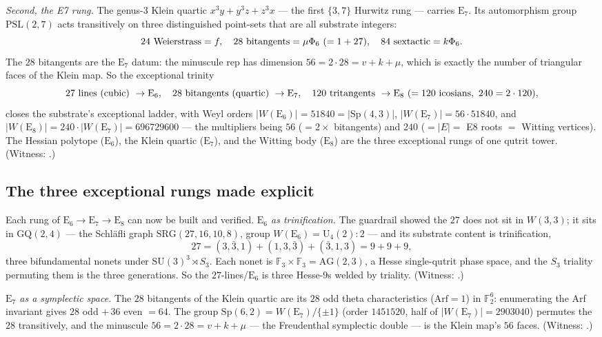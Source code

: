 \documentclass[11pt]{article}
\begin{document}
\emph{Second, the E7 rung.} The genus-$3$ Klein quartic
$x^3y+y^3z+z^3x$ --- the first $\{3,7\}$ Hurwitz rung --- carries $\mathrm E_7$.
Its automorphism group $\mathrm{PSL}(2,7)$ acts transitively on three
distinguished point-sets that are all substrate integers:
\[
  24\ \hbox{Weierstrass}=f,\quad
  28\ \hbox{bitangents}=\mu\Phi_6\ (=1+27),\quad
  84\ \hbox{sextactic}=k\Phi_6 .
\]
The $28$ bitangents are the $\mathrm E_7$ datum: the minuscule rep has dimension
$56=2\cdot28=v+k+\mu$, which is exactly the number of triangular faces of the
Klein map. So the exceptional trinity
\[
  27\ \hbox{lines (cubic)}\ \to \mathrm E_6,\quad
  28\ \hbox{bitangents (quartic)}\ \to \mathrm E_7,\quad
  120\ \hbox{tritangents}\ \to \mathrm E_8\ (=120\ \hbox{icosians},\ 240=2\cdot120),
\]
closes the substrate's exceptional ladder, with Weyl orders
$|W(\mathrm E_6)|=51840=|\mathrm{Sp}(4,3)|$, $|W(\mathrm E_7)|=56\cdot51840$, and
$|W(\mathrm E_8)|=240\cdot|W(\mathrm E_7)|=696729600$ --- the multipliers being
$56$ ($=2\times$ bitangents) and $240$ ($=|E|=$ E8 roots $=$ Witting vertices).
The Hessian polytope ($\mathrm E_6$), the Klein quartic ($\mathrm E_7$), and the
Witting body ($\mathrm E_8$) are the three exceptional rungs of one qutrit tower.
(Witness: .)

\subsection{The three exceptional rungs made explicit}

Each rung of $\mathrm E_6\to\mathrm E_7\to\mathrm E_8$ can now be built and
verified. \emph{$\mathrm E_6$ as trinification.} The guardrail showed the $27$
does not sit in $W(3,3)$; it sits in $\mathrm{GQ}(2,4)$ --- the Schl\"afli graph
$\mathrm{SRG}(27,16,10,8)$, group $W(\mathrm E_6)=\mathrm U_4(2){:}2$ --- and its
substrate content is trinification,
\[
  27=(3,\bar3,1)+(1,3,\bar3)+(\bar3,1,3)=9+9+9,
\]
three bifundamental nonets under $\mathrm{SU}(3)^3\rtimes S_3$. Each nonet is
$\mathbb F_3\times\mathbb F_3=\mathrm{AG}(2,3)$, a Hesse single-qutrit phase
space, and the $S_3$ triality permuting them is the three generations. So the
$27$-lines/$\mathrm E_6$ is three Hesse-$9$s welded by triality. (Witness:
.)

\emph{$\mathrm E_7$ as a symplectic space.} The $28$ bitangents of the Klein
quartic are its $28$ odd theta characteristics ($\mathrm{Arf}=1$) in
$\mathbb F_2^6$: enumerating the Arf invariant gives $28$ odd $+\,36$ even $=64$.
The group $\mathrm{Sp}(6,2)=W(\mathrm E_7)/\{\pm1\}$ (order $1451520$, half of
$|W(\mathrm E_7)|=2903040$) permutes the $28$ transitively, and the minuscule
$56=2\cdot28=v+k+\mu$ --- the Freudenthal symplectic double --- is the Klein
map's $56$ faces. (Witness: .)
\end{document}
